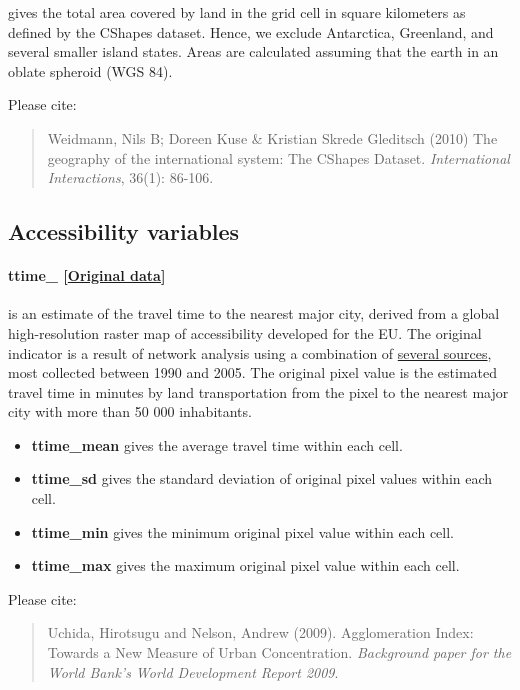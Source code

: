 \documentclass[]{book}
\begin{document}
gives the total area covered by land in the grid cell in square
kilometers as defined by the CShapes dataset. Hence, we exclude
Antarctica, Greenland, and several smaller island states. Areas are
calculated assuming that the earth in an oblate spheroid (WGS 84).

Please cite:

\begin{quote}
Weidmann, Nils B; Doreen Kuse \& Kristian Skrede Gleditsch (2010) The
geography of the international system: The CShapes Dataset.
\emph{International Interactions}, 36(1): 86-106.
\end{quote}

\subsection{Accessibility variables}\label{accessibility-variables}

\paragraph{ttime\_
{[}\href{http://forobs.jrc.ec.europa.eu/products/gam/}{Original
data}{]}}\label{ttime-}

is an estimate of the travel time to the nearest major city, derived
from a global high-resolution raster map of accessibility developed for
the EU. The original indicator is a result of network analysis using a
combination of
\href{http://forobs.jrc.ec.europa.eu/products/gam/sources.php}{several
sources}, most collected between 1990 and 2005. The original pixel value
is the estimated travel time in minutes by land transportation from the
pixel to the nearest major city with more than 50 000 inhabitants.

\begin{itemize}
\itemsep1pt\parskip0pt
\item
  \textbf{ttime\_mean} gives the average travel time within each cell.
\item
  \textbf{ttime\_sd} gives the standard deviation of original pixel
  values within each cell.
\item
  \textbf{ttime\_min} gives the minimum original pixel value within each
  cell.
\item
  \textbf{ttime\_max} gives the maximum original pixel value within each
  cell.
\end{itemize}

Please cite:

\begin{quote}
Uchida, Hirotsugu and Nelson, Andrew (2009). Agglomeration Index:
Towards a New Measure of Urban Concentration. \emph{Background paper for
the World Bank's World Development Report 2009}.
\end{quote}
\end{document}
